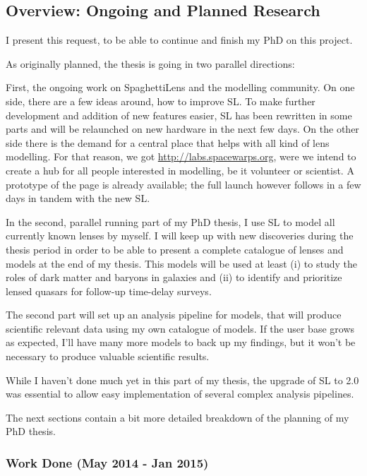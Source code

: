 \documentclass[11pt]{article}
\begin{document}
\subsection{Overview: Ongoing and Planned Research}

I present this request, to be able to continue and finish my PhD on this project.

As originally planned, the thesis is going in two parallel directions:

First, the ongoing work on SpaghettiLens and the modelling community.
On one side, there are a few ideas around, how to improve SL.
To make further development and addition of new features easier, SL has been rewritten in some parts and will be relaunched on new hardware in the next few days.
On the other side there is the demand for a central place that helps with all kind of lens modelling.
For that reason, we got \url{http://labs.spacewarps.org}, were we intend to create a hub for all people interested in modelling, be it volunteer or scientist.
A prototype of the page is already available; the full launch however follows in a few days in tandem with the new SL.


In the second, parallel running part of my PhD thesis, I use SL to model all currently known lenses by myself.
I will keep up with new discoveries during the thesis period in order to be able to present a complete catalogue of lenses and models at the end of my thesis.
This models will be used at least (i) to study the roles of dark matter and baryons in galaxies and (ii) to identify and prioritize lensed quasars for follow-up time-delay surveys.

The second part will set up an analysis pipeline for models, that will produce scientific relevant data using my own catalogue of models.
If the user base grows as expected, I'll have many more models to back up my findings, but it won't be necessary to produce valuable scientific results.

While I haven't done much yet in this part of my thesis, the upgrade of SL to 2.0 was essential to allow easy implementation of several complex analysis pipelines.


The next sections contain a bit more detailed breakdown of the planning of my PhD thesis.


\subsubsection{Work Done (May 2014 - Jan 2015)} \label{sec:plan_done}
\end{document}
